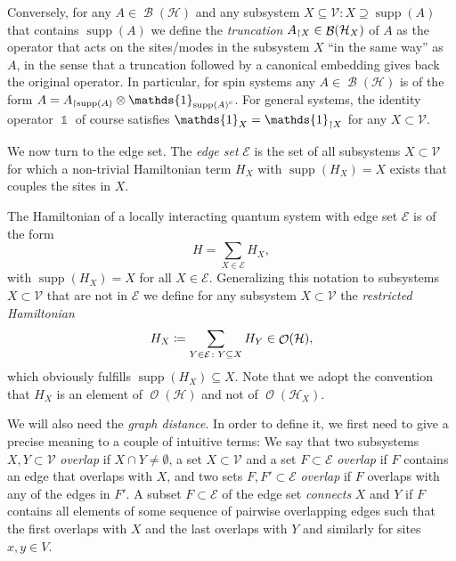 \documentclass[a4paper,12pt,listof=totoc,index=totoc,bibliography=totoc,headsepline=false,headings=normal,BCOR16.153846mm,DIV12,headinclude,twoside,cleardoublepage=empty,numbers=noenddot,final]{scrreprt}
\theoremstyle{mystyle}
\numberwithin{equation}{section}
\numberwithin{figure}{section}
\numberwithin{lemma}{section}
\numberwithin{theorem}{section}
\numberwithin{corollary}{section}
\numberwithin{definition}{section}
\numberwithin{conjecture}{section}
\numberwithin{observation}{section}
\newcommand{\+}{\mkern2mu}
\newcommand{\coloneqq}{\mathrel{\vcentcolon\mkern-1.2mu=}} %
\newcommand{\suchthat}{\colon}
\newcommand{\itholds}{\colon\mathchoice{\quad}{}{}{}}
\renewcommand{\H}{H}
\newcommand{\Vset}{\mathcal{V}}
\newcommand{\Eset}{\mathcal{E}}
\newcommand{\compl}[1]{{{#1}^c}}
\newcommand{\trunc}[2]{{#1}_{\upharpoonright \mathnormal{#2}}}
\DeclareMathOperator{\1}{\mathds{1}}
\DeclareMathOperator{\Bop}{\mathcal{B}}
\DeclareMathOperator{\Obs}{\mathcal{O}}
\DeclareMathOperator{\supp}{supp}
\newcommand{\mc}[1]{\mathcal{#1}}
\newcommand{\mcH}{\mc{H}}
\begin{document}
Conversely, for any $A \in \Bop(\mcH)$ and any subsystem $X \subseteq \Vset\colon X \supseteq \supp(A)$ that contains $\supp(A)$ we define the \emph{truncation} $\trunc A X \in \Bop(\mcH_X)$ of $A$ as the operator that acts on the sites/modes in the subsystem $X$ ``in the same way'' as $A$, in the sense that a truncation followed by a canonical embedding gives back the original operator.
In particular, for spin systems any $A \in \Bop(\mcH)$ is of the form $A = \trunc A {\supp(A)} \otimes \1_{\compl{\supp(A)}}$.
For general systems, the identity operator $\1$ of course satisfies $\1_X = \trunc \1 X$ for any $X \subset \Vset$.

We now turn to the edge set.
The \emph{edge set} $\Eset$ is the set of all subsystems $X \subset \Vset$ for which a non-trivial Hamiltonian term $\H_X$ with $\supp(\H_X) = X$ exists that couples the sites in $X$.

The Hamiltonian of a locally interacting quantum system with edge set $\Eset$ is of the form
\begin{equation} \label{eq:localhamiltonian}
  \H = \sum_{X \in \Eset} \H_X ,
\end{equation}
with $\supp(\H_X) = X$ for all $X \in \Eset$.
Generalizing this notation to subsystems $X \subset \Vset$ that are not in $\Eset$ we define for any subsystem $X \subset \Vset$ the \emph{restricted Hamiltonian}
\begin{equation} \label{eq:restrictedhamiltonian}
  \H_X \coloneqq \sum_{Y \in \Eset\colon Y\subseteq X} \H_Y  \in \Obs(\mcH) ,
\end{equation}
which obviously fulfills $\supp(\H_X) \subseteq X$.
Note that we adopt the convention that $\H_X$ is an element of $\Obs(\mcH)$ and not of $\Obs(\mcH_X)$.

We will also need the \emph{graph distance}.
In order to define it, we first need to give a precise meaning to a couple of intuitive terms:
We say that two subsystems $X,Y \subset \Vset$ \emph{overlap} if $X \cap Y \neq \emptyset$, 
a set $X \subset \Vset$ and a set $F\subset \Eset$ \emph{overlap} if $F$ contains an edge that overlaps with $X$, and two sets $F,F'\subset \Eset$ \emph{overlap} if $F$ overlaps with any of the edges in $F'$. 
A subset $F \subset \Eset$ of the edge set \emph{connects} $X$ and $Y$ if $F$ contains all elements of some sequence of pairwise overlapping edges such that the first overlaps with $X$ and the last overlaps with $Y$ and similarly for sites $x,y \in V$.
\end{document}
